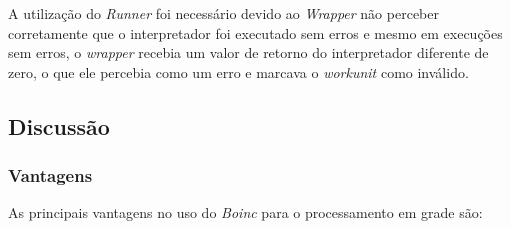 A utilização do \emph{Runner} foi necessário devido ao \emph{Wrapper} não perceber corretamente
que o interpretador foi executado sem erros e mesmo em execuções sem erros, o \emph{wrapper} 
recebia um valor de retorno do interpretador diferente de zero, o que ele percebia como um erro
e marcava o \emph{workunit} como inválido.

\subsection{Discussão}

\subsubsection{Vantagens} 

As principais vantagens no uso do \emph{Boinc} para o processamento em grade são:

